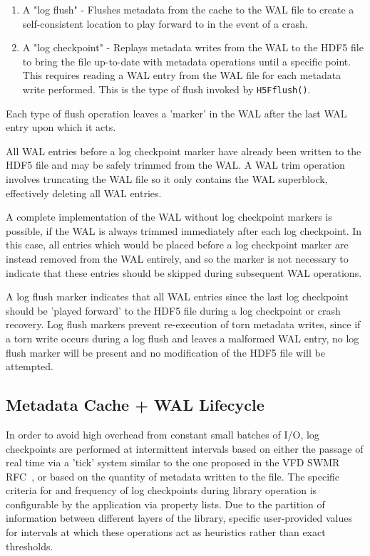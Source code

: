 \begin{enumerate}
    \item A "log flush" - Flushes metadata from the cache to the WAL file to create a self-consistent location to play forward to in the event of a crash.

    \item A "log checkpoint" - Replays metadata writes from the WAL to the HDF5 file to bring the file up-to-date with metadata operations until a specific point. This requires reading a WAL entry from the WAL file for each metadata write performed. This is the type of flush invoked by \texttt{H5Fflush()}.
\end{enumerate}

Each type of flush operation leaves a 'marker' in the WAL after the last WAL entry upon which it acts.

All WAL entries before a log checkpoint marker have already been written to the HDF5 file and may be safely trimmed from the WAL. A WAL trim operation involves truncating the WAL file so it only contains the WAL superblock, effectively deleting all WAL entries.

A complete implementation of the WAL without log checkpoint markers is possible, if the WAL is always trimmed immediately after each log checkpoint. In this case, all entries which would be placed before a log checkpoint marker are instead removed from the WAL entirely, and so the marker is not necessary to indicate that these entries should be skipped during subsequent WAL operations.

A log flush marker indicates that all WAL entries since the last log checkpoint should be 'played forward' to the HDF5 file during a log checkpoint or crash recovery. Log flush markers prevent re-execution of torn metadata writes, since if a torn write occurs during a log flush and leaves a malformed WAL entry, no log flush marker will be present and no modification of the HDF5 file will be attempted.

\subsection{Metadata Cache + WAL Lifecycle}
\label{sec:Metadata-Cache-WAL-Lifecycle}
In order to avoid high overhead from constant small batches of I/O, log checkpoints are performed at intermittent intervals based on either the passage of real time via a 'tick' system similar to the one proposed in the VFD SWMR RFC~\cite{rfc20180610}, or based on the quantity of metadata written to the file. The specific criteria for and frequency of log checkpoints during library operation is configurable by the application via property lists. Due to the partition of information between different layers of the library, specific user-provided values for intervals at which these operations act as heuristics rather than exact thresholds.

